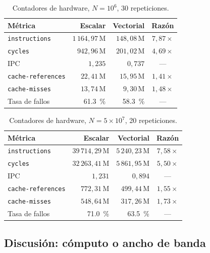 \documentclass[journal]{IEEEtran}
\begin{document}
\begin{table}[ht]
\centering
\caption{Contadores de hardware, $N = 10^6$, 30 repeticiones.}
\label{tab:perf1e6}
\footnotesize
\setlength{\tabcolsep}{3pt}
\begin{tabular}{|l|r|r|c|}
\hline
\textbf{Métrica} & \textbf{Escalar} & \textbf{Vectorial} & \textbf{Razón} \\ \hline
\texttt{instructions}     & $1\,164,97$\,M & $148,08$\,M & $7,87\times$ \\ \hline
\texttt{cycles}           & $942,96$\,M    & $201,02$\,M & $4,69\times$ \\ \hline
IPC                       & $1,235$        & $0,737$     & --- \\ \hline
\texttt{cache-references}  & $22,41$\,M    & $15,95$\,M  & $1,41\times$ \\ \hline
\texttt{cache-misses}     & $13,74$\,M     & $9,30$\,M   & $1,48\times$ \\ \hline
Tasa de fallos            & \SI{61,3}{\percent}     & \SI{58,3}{\percent}  & --- \\ \hline
\end{tabular}
\end{table}

\begin{table}[ht]
\centering
\caption{Contadores de hardware, $N = 5\times10^7$, 20 repeticiones.}
\label{tab:perf5e7}
\footnotesize
\setlength{\tabcolsep}{3pt}
\begin{tabular}{|l|r|r|c|}
\hline
\textbf{Métrica} & \textbf{Escalar} & \textbf{Vectorial} & \textbf{Razón} \\ \hline
\texttt{instructions}     & $39\,714,29$\,M & $5\,240,23$\,M & $7,58\times$ \\ \hline
\texttt{cycles}           & $32\,263,41$\,M & $5\,861,95$\,M & $5,50\times$ \\ \hline
IPC                       & $1,231$         & $0,894$        & --- \\ \hline
\texttt{cache-references}  & $772,31$\,M    & $499,44$\,M    & $1,55\times$ \\ \hline
\texttt{cache-misses}     & $548,64$\,M     & $317,26$\,M    & $1,73\times$ \\ \hline
Tasa de fallos            & \SI{71,0}{\percent}      & \SI{63,5}{\percent}     & --- \\ \hline
\end{tabular}
\end{table}

\subsection{Discusión: cómputo o ancho de banda}
\end{document}
